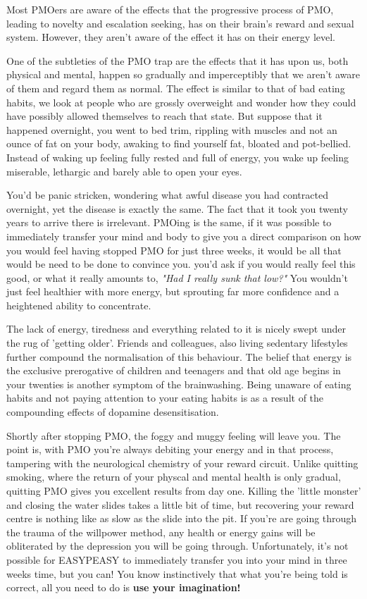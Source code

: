 \documentclass[easypeasy.tex]{subfiles}
\begin{document}
Most PMOers are aware of the effects that the progressive process of PMO, leading to novelty and escalation seeking, has on their brain's reward and sexual system. However, they aren't aware of the effect it has on their energy level.

One of the subtleties of the PMO trap are the effects that it has upon us, both physical and mental, happen so gradually and imperceptibly that we aren't aware of them and regard them as normal. The effect is similar to that of bad eating habits, we look at people who are grossly overweight and wonder how they could have possibly allowed themselves to reach that state. But suppose that it happened overnight, you went to bed trim, rippling with muscles and not an ounce of fat on your body, awaking to find yourself fat, bloated and pot-bellied. Instead of waking up feeling fully rested and full of energy, you wake up feeling miserable, lethargic and barely able to open your eyes.

You'd be panic stricken, wondering what awful disease you had contracted overnight, yet the disease is exactly the same. The fact that it took you twenty years to arrive there is irrelevant. PMOing is the same, if it was possible to immediately transfer your mind and body to give you a direct comparison on how you would feel having stopped PMO for just three weeks, it would be all that would be need to be done to convince you. you'd ask if you would really feel this good, or what it really amounts to, \textit{"Had I really sunk that low?"} You wouldn't just feel healthier with more energy, but sprouting far more confidence and a heightened ability to concentrate.

The lack of energy, tiredness and everything related to it is nicely swept under the rug of 'getting older'. Friends and colleagues, also living sedentary lifestyles further compound the normalisation of this behaviour. The belief that energy is the exclusive prerogative of children and teenagers and that old age begins in your twenties is another symptom of the brainwashing. Being unaware of eating habits and not paying attention to your eating habits is as a result of the compounding effects of dopamine desensitisation.

Shortly after stopping PMO, the foggy and muggy feeling will leave you. The point is, with PMO you're always debiting your energy and in that process, tampering with the neurological chemistry of your reward circuit. Unlike quitting smoking, where the return of your physcal and mental health is only gradual, quitting PMO gives you excellent results from day one. Killing the 'little monster' and closing the water slides takes a little bit of time, but recovering your reward centre is nothing like as slow as the slide into the pit. If you're are going through the trauma of the willpower method, any health or energy gains will be obliterated by the depression you will be going through. Unfortunately, it's not possible for EASYPEASY to immediately transfer you into your mind in three weeks time, but you can! You know instinctively that what you're being told is correct, all you need to do is \textbf{use your imagination!}
\end{document}
